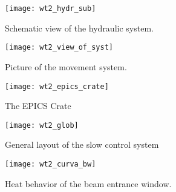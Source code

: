 %
\begin{figure}
\begin{center}\texttt{[image: wt2\_hydr\_sub]}\end{center}


\caption{Schematic view of the hydraulic system.}

\label{fig:wt_acqua}
\end{figure}


%
\begin{figure}
\begin{center}\texttt{[image: wt2\_view\_of\_syst]}\end{center}


\caption{Picture of the movement system.}

\label{fig:wt_total-view}
\end{figure}


%
%
%
%


%
\begin{figure}
\begin{center}\texttt{[image: wt2\_epics\_crate]}\end{center}


\caption{The EPICS Crate}

\label{fig:wt_crate}
\end{figure}


%
\begin{figure}
\begin{center}\texttt{[image: wt2\_glob]}\end{center}


\caption{General layout of the slow control system}

\label{fig:wt_fig1}
\end{figure}


%
\begin{figure}
\begin{center}\texttt{[image: wt2\_curva\_bw]}\end{center}


\caption{Heat behavior of the beam entrance window.}

\label{fig:wt_curva}
\end{figure}


